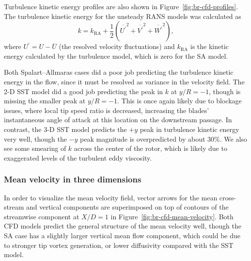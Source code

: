 \documentclass[aip,graphicx]{revtex4-1}
\begin{document}
Turbulence kinetic energy profiles are also shown in
Figure~\ref{fig:br-cfd-profiles}. The turbulence kinetic energy for the unsteady
RANS models was calculated as
\begin{equation}
    k = k_{\mathrm{RA}} + \frac{1}{2} \left(
    \overline{U^\prime}^2 +
    \overline{V^\prime}^2 +
    \overline{W^\prime}^2 \right),
    \label{eq:k}
\end{equation}
where $U^\prime = U - \overline{U}$ (the resolved velocity fluctuations) and
$k_{\mathrm{RA}}$ is the kinetic energy calculated by the turbulence model,
which is zero for the SA model.

Both Spalart--Allmaras cases did a poor job predicting the turbulence kinetic
energy in the flow, since it must be resolved as variance in the velocity field.
The 2-D SST model did a good job predicting the peak in $k$ at $y/R=-1$, though
is missing the smaller peak at $y/R=-1$. This is once again likely due to
blockage issues, where local tip speed ratio is decreased, increasing the
blades' instantaneous angle of attack at this location on the downstream
passage. In contrast, the 3-D SST model predicts the $+y$ peak in turbulence
kinetic energy very well, though the $-y$ peak magnitude is overpredicted by
about 30\%. We also see some smearing of $k$ across the center of the rotor,
which is likely due to exaggerated levels of the turbulent eddy viscosity.


\subsubsection{Mean velocity in three dimensions}

In order to visualize the mean velocity field, vector arrows for the mean
cross-stream and vertical components are superimposed on top of contours of the
streamwise component at $X/D=1$ in Figure~\ref{fig:br-cfd-mean-velocity}. Both
CFD models predict the general structure of the mean velocity well, though the
SA case has a slightly larger vertical mean flow component, which could be due
to stronger tip vortex generation, or lower diffusivity compared with the SST
model.
\end{document}
